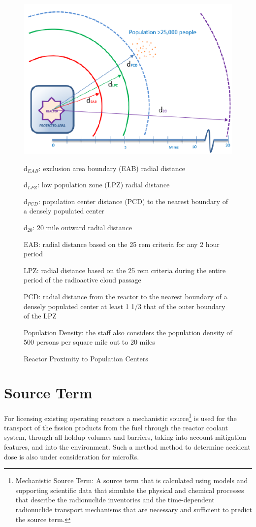 \documentclass[10pt,a4paper]{article}
\begin{document}
\begin{figure}[hbtp]
\centering
\includegraphics[scale=0.7]{Figs/reactorproximity.jpeg}
\caption{Reactor Proximity to Population Centers}
\label{rprox}

\flushleft
d$_{EAB}$: exclusion area boundary (EAB) radial distance

d$_{LPZ}$: low population zone (LPZ) radial distance

d$_{PCD}$: population center distance (PCD) to the nearest boundary of a densely populated center

d$_{20}$: 20 mile outward radial distance 

EAB: radial distance based on the 25 rem criteria for any 2 hour period

LPZ: radial distance based on the 25 rem criteria during the entire period of the radioactive cloud passage

PCD: radial distance from the reactor to the nearest boundary of a densely populated center at least 1 1/3 that of the outer boundary of the LPZ

Population Density: the staff also considers the population density of 500 persons per square mile out to 20 miles
\end{figure} 

\pagebreak
\section{Source Term}

 For licensing existing operating reactors a mechanistic source\footnote{Mechanistic Source Term: A source term that is calculated using models and supporting scientific data that simulate the physical and chemical processes that describe the radionuclide inventories and the time-dependent radionuclide transport mechanisms that are necessary and sufficient to predict the source term.}
 is used for the transport of the fission products from the fuel through the reactor coolant system, through all holdup volumes and barriers, taking into account mitigation features, and into the environment. Such a method method to determine accident dose is also under consideration for microRs.  
 
\end{document}
